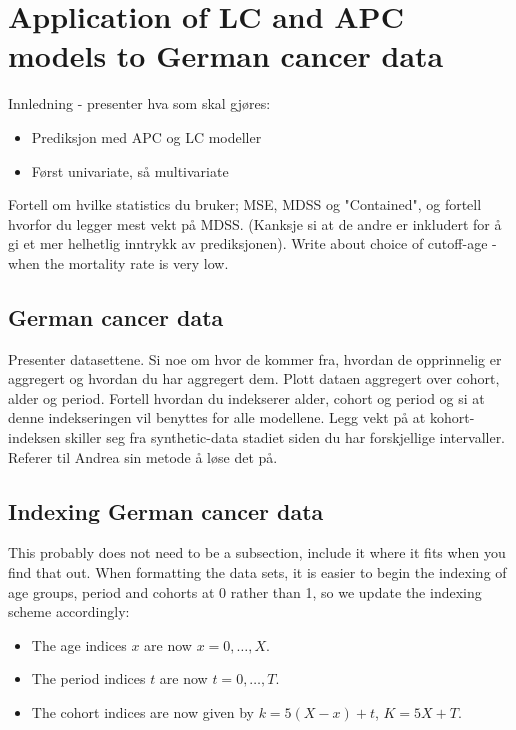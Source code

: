\newpage
\section{Application of LC and APC models to German cancer data}
\textcolor{myDarkGreen}{Innledning - presenter hva som skal gjøres:
\begin{itemize}
    \item Prediksjon med APC og LC modeller
    \item Først univariate, så multivariate
\end{itemize}
\newline \newline
Fortell om hvilke statistics du bruker; MSE, MDSS og "Contained", og fortell hvorfor du legger mest vekt på MDSS. (Kanksje si at de andre er inkludert for å gi et mer helhetlig inntrykk av prediksjonen). 
Write about choice of cutoff-age - when the mortality rate is very low. 
}

\subsection{German cancer data}
\textcolor{myDarkGreen}{
Presenter datasettene. Si noe om hvor de kommer fra, hvordan de opprinnelig er aggregert og hvordan du har aggregert dem. Plott dataen aggregert over cohort, alder og period. Fortell hvordan du indekserer alder, cohort og period og si at denne indekseringen vil benyttes for alle modellene. Legg vekt på at kohort-indeksen skiller seg fra synthetic-data stadiet siden du har forskjellige intervaller. Referer til Andrea sin metode å løse det på. 
}

\subsection{Indexing German cancer data}
\textcolor{myDarkGreen}{This probably does not need to be a subsection, include it where it fits when you find that out. }
When formatting the data sets, it is easier to begin the indexing of age groups, period and cohorts at 0 rather than 1, so we update the indexing scheme accordingly:
\begin{itemize}
    \item The age indices $x$ are now $x = 0,\ldots,X$.
    \item The period indices $t$ are now $t = 0, \ldots, T$.
    \item The cohort indices are now given by $k = 5(X - x) + t$, $K = 5X + T$.
\end{itemize}


